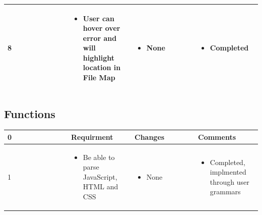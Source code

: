 \documentclass[letterpaper,10pt,titlepage,draftclsnofoot,onecolumn,onesided] {IEEEtran}
\begin{document}
{\begin{center}
\begin{singlespace}
\begin{tabular}{ |  p{0.25\linewidth}  |  p{0.25\linewidth}  | p{0.25\linewidth} | p{0.25\linewidth} |}
        \\ \hline

        	8
		& 
			\begin{itemize}
				\item User can hover over error and will highlight location in File Map
			\end{itemize}
		& 
			\begin{itemize}
				\item None
			\end{itemize}
		&
			\begin{itemize}
				\item Completed
			\end{itemize} 
		
        \\ \hline
		\end{tabular}
	\end{singlespace}
\end{center}
}

\subsection{Functions}
\small{
\begin{center}
	\begin{singlespace}
		\begin{tabular}{ |  p{0.25\linewidth}  |  p{0.25\linewidth}  | p{0.25\linewidth} | p{0.25\linewidth} |}
		\hline
		0 & Requirment & Changes & Comments \\ \hline
		
			1
		& 
			\begin{itemize}
				\item Be able to parse JavaScript, HTML and CSS
			\end{itemize}
		& 
			\begin{itemize}
				\item None
			\end{itemize}
		&
			\begin{itemize}
				\item Completed, implmented through user grammars
			\end{itemize} 
		
        \\ \hline

		\end{tabular}
	\end{singlespace}
\end{center}
}
\end{document}
